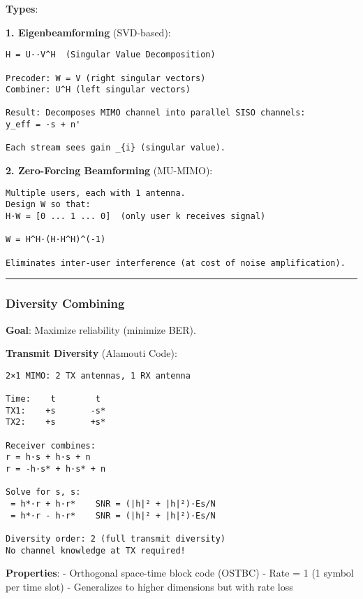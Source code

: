 \textbf{Types}:

\textbf{1. Eigenbeamforming} (SVD-based):

\begin{verbatim}
H = U··V^H  (Singular Value Decomposition)

Precoder: W = V (right singular vectors)
Combiner: U^H (left singular vectors)

Result: Decomposes MIMO channel into parallel SISO channels:
y_eff = ·s + n'

Each stream sees gain _{i} (singular value).
\end{verbatim}

\textbf{2. Zero-Forcing Beamforming} (MU-MIMO):

\begin{verbatim}
Multiple users, each with 1 antenna.
Design W so that:
H·W = [0 ... 1 ... 0]  (only user k receives signal)

W = H^H·(H·H^H)^(-1)

Eliminates inter-user interference (at cost of noise amplification).
\end{verbatim}

\begin{center}\rule{0.5\linewidth}{0.5pt}\end{center}

\subsubsection{Diversity Combining}\label{diversity-combining}

\textbf{Goal}: Maximize reliability (minimize BER).

\textbf{Transmit Diversity} (Alamouti Code):

\begin{verbatim}
2×1 MIMO: 2 TX antennas, 1 RX antenna

Time:    t        t
TX1:    +s       -s*
TX2:    +s       +s*

Receiver combines:
r = h·s + h·s + n
r = -h·s* + h·s* + n

Solve for s, s:
 = h*·r + h·r*    SNR = (|h|² + |h|²)·Es/N
 = h*·r - h·r*    SNR = (|h|² + |h|²)·Es/N

Diversity order: 2 (full transmit diversity)
No channel knowledge at TX required!
\end{verbatim}

\textbf{Properties}: - Orthogonal space-time block code (OSTBC) - Rate =
1 (1 symbol per time slot) - Generalizes to higher dimensions but with
rate loss

